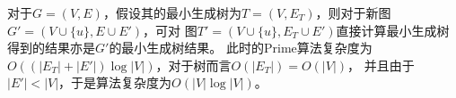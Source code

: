 \begin{solution}
    对于$G=(V,E)$，假设其的最小生成树为$T=(V,E_T)$，则对于新图$G'=(V\cup\{u\},E\cup E')$，可对
    图$T'=(V\cup\{u\},E_T\cup E')$直接计算最小生成树得到的结果亦是$G'$的最小生成树结果。
    此时的Prime算法复杂度为$O((|E_T|+|E'|)\log|V|)$，对于树而言$O(|E_T|)=O(|V|)$，
    并且由于$|E'|<|V|$，于是算法复杂度为$O(|V|\log|V|)$。
\end{solution}